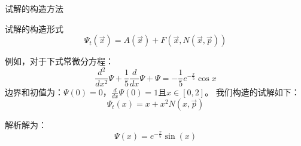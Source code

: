 \documentclass[hyperref,UTF8,11pt]{beamer}
\begin{document}
\begin{frame}{试解的构造方法}
\begin{block}{试解的构造形式}
	\begin{equation}
	\Psi_{t}(\vec{x})=A(\vec{x})+F(\vec{x}, N(\vec{x}, \vec{p}))
	\end{equation}
\end{block}
例如，对于下式常微分方程：
\begin{equation}
\frac{d^{2}}{d x^{2}} \Psi+\frac{1}{5} \frac{d}{d x} \Psi+\Psi=-\frac{1}{5} e^{-\frac{x}{5}} \cos x
\end{equation}
边界和初值为：$\Psi(0)=0$，$\frac{d}{d x} \Psi(0)=1$且$x \in[0,2]$。
我们构造的试解如下：
\begin{equation}
\Psi_{t}(x)=x+x^{2} N(x, \vec{p})
\end{equation}

解析解为：
\begin{equation}
\Psi(x)=e^{-\frac{x}{5}} \sin (x)
\end{equation}

\end{frame}


\end{document}
